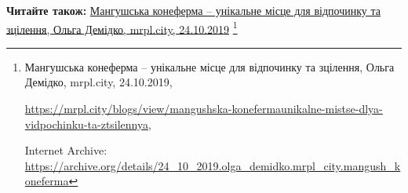  
 
 
 
 

\def\pubIA{https://archive.org/details/24_10_2019.olga_demidko.mrpl_city.mangush_koneferma}
\def\pubTitle{Мангушська конеферма – унікальне місце для відпочинку та зцілення}
\def\pubDate{24.10.2019}
\def\pubOrigin{https://mrpl.city/blogs/view/mangushska-konefermaunikalne-mistse-dlya-vidpochinku-ta-ztsilennya}
\def\pubAuthor{Ольга Демідко}

\textbf{Читайте також:} \href{\pubIA}{%
\pubTitle, \pubAuthor, mrpl.city, \pubDate}%
\footnote{\pubTitle, \pubAuthor, mrpl.city, \pubDate, \par\url{\pubOrigin}, \par Internet Archive: \url{\pubIA}}
